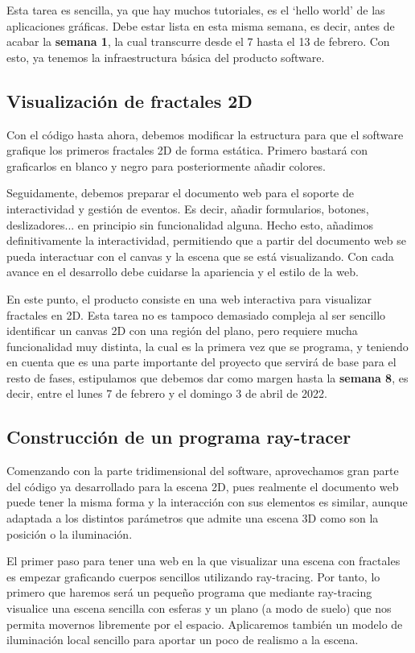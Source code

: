 Esta tarea es sencilla, ya que hay muchos tutoriales, es el `hello world' de las aplicaciones gráficas. Debe estar lista en esta misma semana, es decir, antes de acabar la \textbf{semana 1}, la cual transcurre desde el 7 hasta el 13 de febrero. Con esto, ya tenemos la infraestructura básica del producto software.

\subsection{Visualización de fractales 2D}

Con el código hasta ahora, debemos modificar la estructura para que el software grafique los primeros fractales 2D de forma estática. Primero bastará con graficarlos en blanco y negro para posteriormente añadir colores.

Seguidamente, debemos preparar el documento web para el soporte de interactividad y gestión de eventos. Es decir, añadir formularios, botones, deslizadores... en principio sin funcionalidad alguna. Hecho esto, añadimos definitivamente la interactividad, permitiendo que a partir del documento web se pueda interactuar con el canvas y la escena que se está visualizando. Con cada avance en el desarrollo debe cuidarse la apariencia y el estilo de la web.

En este punto, el producto consiste en una web interactiva para visualizar fractales en 2D. Esta tarea no es tampoco demasiado compleja al ser sencillo identificar un canvas 2D con una región del plano, pero requiere mucha funcionalidad muy distinta, la cual es la primera vez que se programa, y teniendo en cuenta que es una parte importante del proyecto que servirá de base para el resto de fases, estipulamos que debemos dar como margen hasta la \textbf{semana 8}, es decir, entre el lunes 7 de febrero y el domingo 3 de abril de 2022.

\subsection{Construcción de un programa ray-tracer}

Comenzando con la parte tridimensional del software, aprovechamos gran parte del código ya desarrollado para la escena 2D, pues realmente el documento web puede tener la misma forma y la interacción con sus elementos es similar, aunque adaptada a los distintos parámetros que admite una escena 3D como son la posición o la iluminación.

El primer paso para tener una web en la que visualizar una escena con fractales es empezar graficando cuerpos sencillos utilizando ray-tracing. Por tanto, lo primero que haremos será un pequeño programa que mediante ray-tracing visualice una escena sencilla con esferas y un plano (a modo de suelo) que nos permita movernos libremente por el espacio. Aplicaremos también un modelo de iluminación local sencillo para aportar un poco de realismo a la escena.

